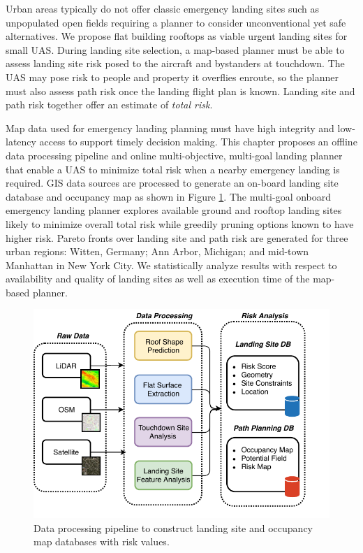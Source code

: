 
Urban areas typically do not offer classic emergency landing sites such as unpopulated open fields requiring a planner to consider unconventional yet safe alternatives. We propose flat building rooftops as viable urgent landing sites for small UAS.  During landing site selection, a map-based planner must be able to assess landing site risk posed to the aircraft and bystanders at touchdown. The UAS may pose risk to people and property it overflies enroute, so the planner must also assess path risk once the landing flight plan is known.  Landing site and path risk together offer an estimate of \emph{total risk}.

Map data used for emergency landing planning must have high integrity and low-latency access to support timely decision making. This chapter proposes an offline data processing pipeline and online multi-objective, multi-goal landing planner that enable a UAS to minimize total risk when a nearby emergency landing is required. GIS data sources are processed to generate an on-board landing site database and occupancy map as shown in Figure \ref{fig:ch5_overview_processing}.  The multi-goal onboard emergency landing planner explores available ground and rooftop landing sites likely to minimize overall total risk while greedily pruning options known to have higher risk.   Pareto fronts over landing site and path risk are generated for three urban regions: Witten, Germany; Ann Arbor, Michigan; and mid-town Manhattan in New York City. We statistically analyze results with respect to availability and quality of landing sites as well as execution time of the map-based planner.


\begin{figure}[!t]
    \centering
    \includegraphics[clip, trim=0.0cm 0cm 0cm 0cm, width=0.6\linewidth]{chapter_5_mapping/imgs/data_preprocessing-Page-1.pdf}
    \caption{Data processing pipeline to construct landing site and occupancy map databases with risk values.}
    \label{fig:ch5_overview_processing}
\end{figure}


